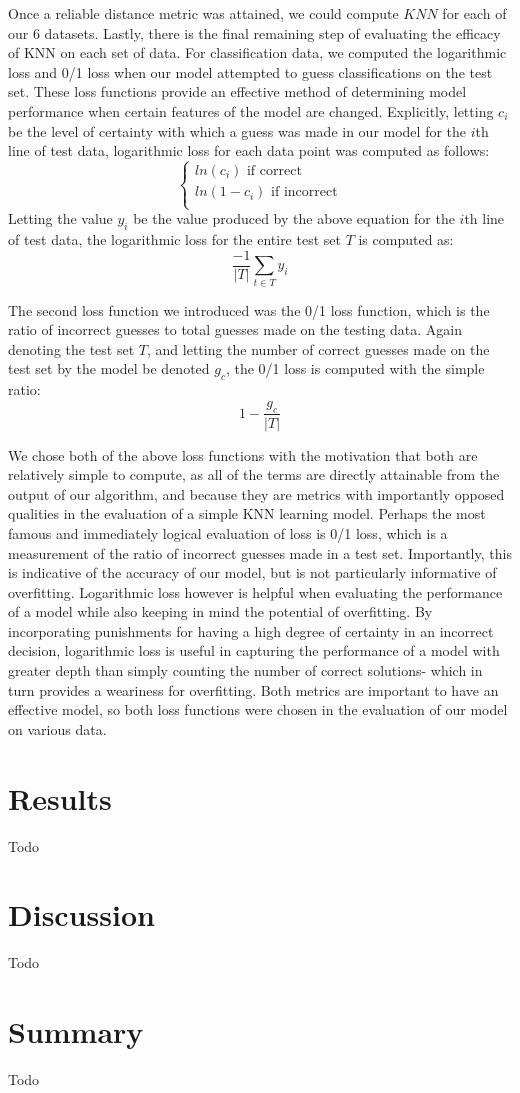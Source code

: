 \documentclass[twoside,11pt]{article}
\begin{document}
 Once a reliable distance metric was attained, we could compute $KNN$ for each of our 6 datasets. Lastly, there is the final remaining step of evaluating 
 the efficacy of KNN on each set of data. For classification data, we computed the logarithmic loss and 0/1 loss when our model attempted to guess
 classifications on the test set. 
These loss functions provide an effective method of determining model performance when certain features of the model are changed. Explicitly, letting $c_i$ be the level 
of certainty with which a guess was made in our model for the $i$th line of test data, logarithmic loss for each data point was computed as follows:
\[\begin{cases}
	ln(c_i) \text{ if correct}\\
	ln(1-c_i) \text{ if incorrect}\\
\end{cases}\]
Letting the value $y_i$ be the value produced by the above equation for the $i$th line of test data, the logarithmic loss  for the entire test set $T$ is computed
as:
\begin{equation}
\frac{-1}{|T|}\sum_{t \in T}^{ } y_i
\end{equation}

The second loss function we introduced was the 0/1 loss function, which is the ratio of incorrect guesses to total guesses made on the testing data.
Again denoting the test set $T$, and letting the number of correct guesses made on the test set by the model be denoted $g_c$, the 0/1 loss is computed with the simple ratio:
\begin{equation}
	1 - \frac{g_c}{|T|}
\end{equation}

We chose both of the above loss functions with the motivation that both are relatively simple to compute, as all of the terms are directly attainable from the output of our algorithm, and
because they are metrics with importantly opposed qualities in the evaluation of a simple KNN learning model. Perhaps the most famous and immediately logical evaluation of loss is 0/1 loss, 
which is a measurement of the ratio of incorrect guesses made in a test set. Importantly, this is indicative of the accuracy of our model, but is not particularly informative of overfitting.
Logarithmic loss however is helpful when evaluating the performance of a model while also keeping in mind the potential of overfitting. By incorporating punishments for having a high degree
of certainty in an incorrect decision, logarithmic loss is useful in capturing the performance of a model with greater depth than simply counting the number of correct solutions- 
which in turn provides a weariness for overfitting.
Both metrics are important to have an effective model, so both loss functions were chosen in the evaluation of our model on various data.


\section{Results}
Todo

\section{Discussion}
Todo


\section{Summary}
Todo
\end{document}
